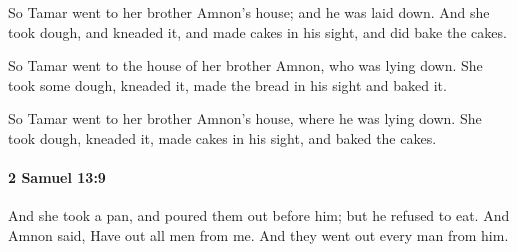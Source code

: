 			\begin{versebox}
					\item[BHS] 
					\item[ASV] So Tamar went to her brother Amnon's house; and he was laid down. And she took dough, and kneaded it, and made cakes in his sight, and did bake the cakes.
					\item[NIV] So Tamar went to the house of her brother Amnon, who was lying down. She took some dough, kneaded it, made the bread in his sight and baked it.
					\item[NRSV] So Tamar went to her brother Amnon’s house, where he was lying down. She took dough, kneaded it, made cakes in his sight, and baked the cakes.
			\end{versebox}

		\paragraph{2 Samuel 13:9} %
			\label{2SAMUEL-13-9}

			And she took a pan, and poured them out before him; but he refused to eat. And Amnon said, Have out all men from me. And they went out every man from him.

